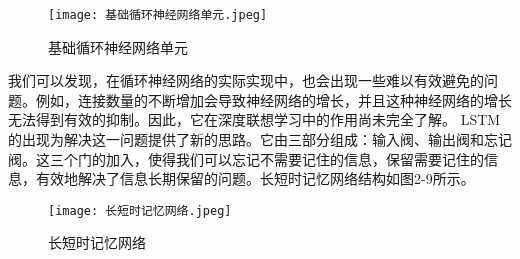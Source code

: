 \begin{figure}[hbt]
	\centering
	\texttt{[image: 基础循环神经网络单元.jpeg]}
	\caption{基础循环神经网络单元}
	\label{f.example}
\end{figure}

我们可以发现，在循环神经网络的实际实现中，也会出现一些难以有效避免的问题。例如，连接数量的不断增加会导致神经网络的增长，并且这种神经网络的增长无法得到有效的抑制。因此，它在深度联想学习中的作用尚未完全了解。 LSTM\cite{hochreiter1997long}的出现为解决这一问题提供了新的思路。它由三部分组成：输入阀、输出阀和忘记阀。这三个门的加入，使得我们可以忘记不需要记住的信息，保留需要记住的信息，有效地解决了信息长期保留的问题。长短时记忆网络结构如图2-9所示。

\begin{figure}[hbt]
	\centering
	\texttt{[image: 长短时记忆网络.jpeg]}
	\caption{长短时记忆网络}
	\label{f.example}
\end{figure}


